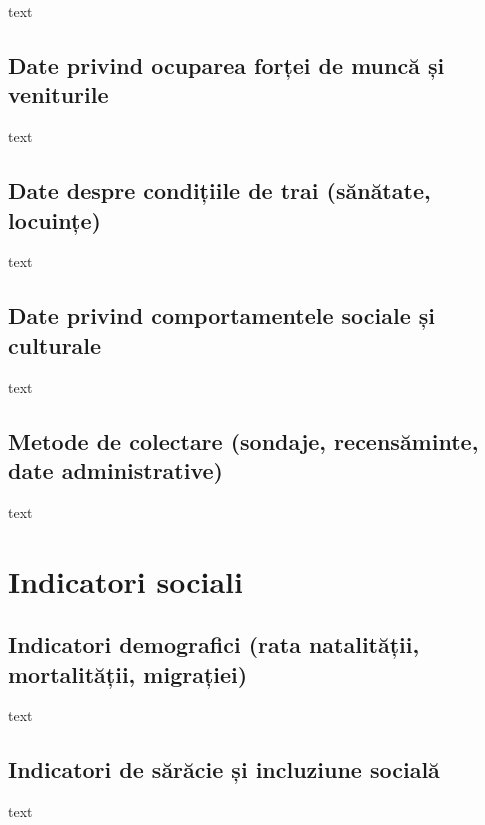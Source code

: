 \documentclass[
  11pt,
  b5paper,
  nottoc]{book}
\begin{document}
text

\subsection{Date privind ocuparea forței de muncă și
veniturile}\label{date-privind-ocuparea-forux21bei-de-muncux103-ux219i-veniturile}

text

\subsection{Date despre condițiile de trai (sănătate,
locuințe)}\label{date-despre-condiux21biile-de-trai-sux103nux103tate-locuinux21be}

text

\subsection{Date privind comportamentele sociale și
culturale}\label{date-privind-comportamentele-sociale-ux219i-culturale}

text

\subsection{Metode de colectare (sondaje, recensăminte, date
administrative)}\label{metode-de-colectare-sondaje-recensux103minte-date-administrative}

text

\section{Indicatori sociali}\label{indicatori-sociali}

\subsection{Indicatori demografici (rata natalității, mortalității,
migrației)}\label{indicatori-demografici-rata-natalitux103ux21bii-mortalitux103ux21bii-migraux21biei}

text

\subsection{Indicatori de sărăcie și incluziune
socială}\label{indicatori-de-sux103rux103cie-ux219i-incluziune-socialux103}

text
\end{document}
